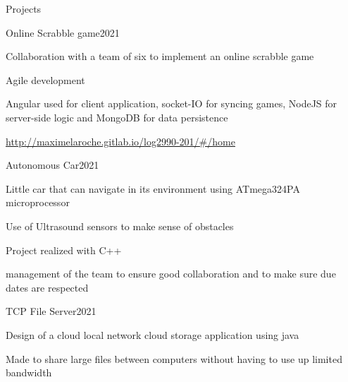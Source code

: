\documentclass{resume} %
\begin{document}
	\begin{rSection}{Projects}
		\begin{rSubsection}{Online Scrabble game}{2021}{}{}
			\item Collaboration with a team of six to implement an online scrabble game
			\item Agile development
			\item Angular used for client application, socket-IO for syncing games, NodeJS for server-side logic and MongoDB for data persistence
			\item \url{http://maximelaroche.gitlab.io/log2990-201/#/home}
		 \end{rSubsection}
		\begin{rSubsection}{Autonomous Car}{2021}{}{}
			\item Little car that can navigate in its environment using ATmega324PA microprocessor
			\item Use of Ultrasound sensors to make sense of obstacles
			\item Project realized with C++
			\item management of the team to ensure good collaboration and to make sure due dates are respected
		 \end{rSubsection}

		 \begin{rSubsection}{TCP File Server}{2021}{}{}
			\item Design of a cloud local network cloud storage application using java
			\item Made to share large files between computers without having to use up limited bandwidth
		\end{rSubsection}


\end{rSection}
\end{document}
